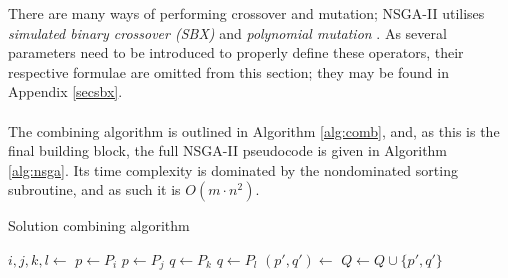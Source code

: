 \documentclass[12pt,a4paper,twoside,openright]{report}
\begin{document}
There are many ways of performing crossover and mutation; NSGA-II utilises \emph{simulated binary crossover (SBX)} and \emph{polynomial mutation} \cite{deb1994simulated}. As several parameters need to be introduced to properly define these operators, their respective formulae are omitted from this section; they may be found in Appendix \ref{secsbx}.\\ \\
The combining algorithm is outlined in Algorithm \ref{alg:comb}, and, as this is the final building block, the full NSGA-II pseudocode is given in Algorithm \ref{alg:nsga}. Its time complexity is dominated by the nondominated sorting subroutine, and as such it is $O(m\cdot n^2)$.
\begin{algorithm}[H]
\caption{Solution combining algorithm}\label{alg:comb}
\begin{algorithmic}[1]
 
		\State $i, j, k, l\gets$  
		 $p\gets P_i$ 
		\Else{} $p\gets P_j$
		\EndIf
		 $q\gets P_k$ 
		\Else{} $q\gets P_l$
		\EndIf
		\State $(p', q')\gets$  
		\State {} 
		\State {}
		\State $Q\gets Q\cup\{p', q'\}$ 
	\EndFor
	\State {}
\EndFunction
{}
\end{algorithmic}
\end{algorithm}
\end{document}

